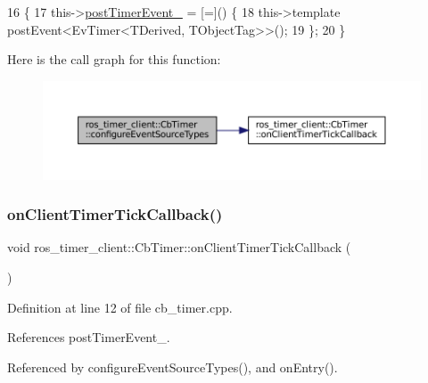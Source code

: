 \begin{DoxyCode}
16   \{
17     this->\hyperlink{classros__timer__client_1_1CbTimer_a7e15bf1451d17c96aba814dc3e5c08e9}{postTimerEvent\_} = [=]() \{
18       this->\textcolor{keyword}{template} postEvent<EvTimer<TDerived, TObjectTag>>();
19     \};
20   \}
\end{DoxyCode}
Here is the call graph for this function\+:
\nopagebreak
\begin{figure}[H]
\begin{center}
\leavevmode
\includegraphics[width=350pt]{classros__timer__client_1_1CbTimer_a11226b0050d363187aa1bfe3e9c672af_cgraph}
\end{center}
\end{figure}
\mbox{\label{classros__timer__client_1_1CbTimer_ad75f8dfb3baa32e3ba7d373e8d902b47}} 
\subsubsection{\texorpdfstring{on\+Client\+Timer\+Tick\+Callback()}{onClientTimerTickCallback()}}
{\footnotesize\ttfamily void ros\+\_\+timer\+\_\+client\+::\+Cb\+Timer\+::on\+Client\+Timer\+Tick\+Callback (\begin{DoxyParamCaption}{ }\end{DoxyParamCaption})}



Definition at line 12 of file cb\+\_\+timer.\+cpp.



References post\+Timer\+Event\+\_\+.



Referenced by configure\+Event\+Source\+Types(), and on\+Entry().


